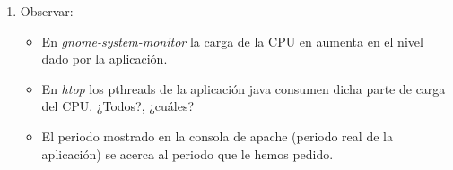 \documentclass[a4paper,11pt,spanish,twoside]{article}
\begin{document}
\begin{enumerate}
\item Observar:

  \begin{itemize}
  \item En \emph{gnome-system-monitor} la carga de la CPU en aumenta
    en el nivel dado por la aplicación.

  \item En \emph{htop} los pthreads de la aplicación java consumen dicha parte de
    carga del CPU.  ¿Todos?, ¿cuáles?


  \item El periodo mostrado en la consola de apache (periodo real de
    la aplicación) se acerca al periodo que le hemos pedido.


  \end{itemize}


\end{enumerate}





% 
% 
\end{document}
